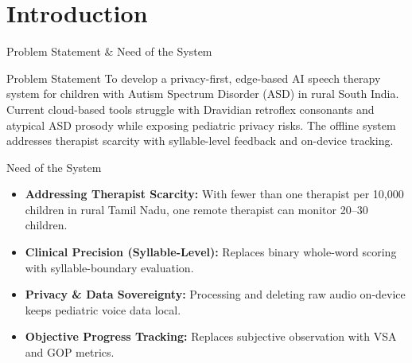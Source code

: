 \documentclass[aspectratio=169, 11pt, xcolor=table]{beamer}
\begin{document}
\section{Introduction}
\begin{frame}{Problem Statement \& Need of the System}
    \vspace{-2mm}
    \begin{block}{\small Problem Statement}
        \small 
        To develop a privacy-first, edge-based AI speech therapy system for children with Autism Spectrum Disorder (ASD) in rural South India. Current cloud-based tools struggle with Dravidian retroflex consonants and atypical ASD prosody while exposing pediatric privacy risks. The offline system addresses therapist scarcity with syllable-level feedback and on-device tracking.
    \end{block}

    \vspace{2mm}

    \begin{block}{\small Need of the System}
        \footnotesize
        \begin{itemize}
            \setlength{\itemsep}{4pt}
            \item \textbf{Addressing Therapist Scarcity:} With fewer than one therapist per 10,000 children in rural Tamil Nadu, one remote therapist can monitor 20--30 children.
            \item \textbf{Clinical Precision (Syllable-Level):} Replaces binary whole-word scoring with syllable-boundary evaluation.
            \item \textbf{Privacy \& Data Sovereignty:} Processing and deleting raw audio on-device keeps pediatric voice data local.
            \item \textbf{Objective Progress Tracking:} Replaces subjective observation with VSA and GOP metrics.
        \end{itemize}
    \end{block}
\end{frame}
\end{document}
